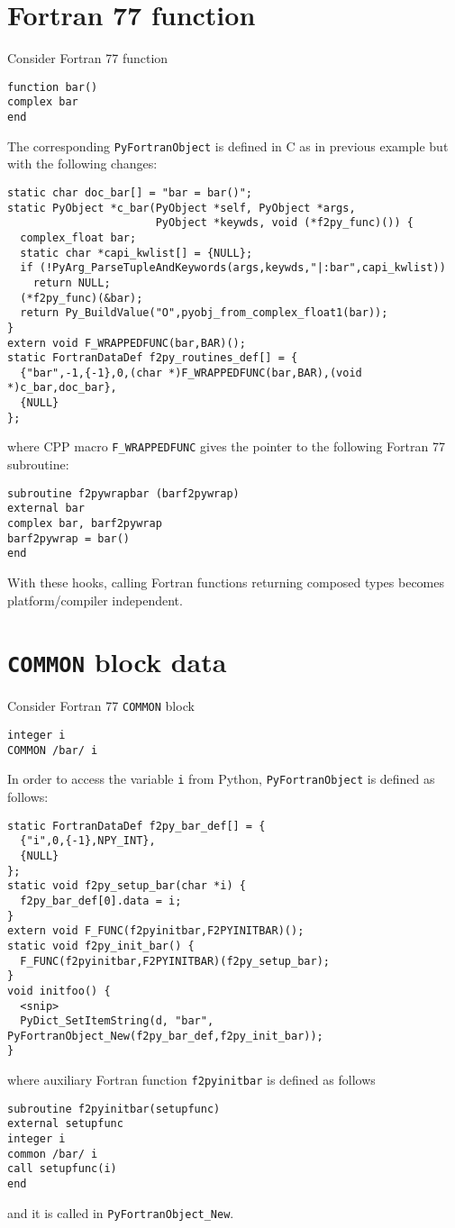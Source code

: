 \documentclass{article}
\begin{document}
\section{Fortran 77 function}
\label{sec:f77func}
Consider Fortran 77 function
\begin{verbatim}
function bar()
complex bar
end
\end{verbatim}
The corresponding \texttt{PyFortranObject} is defined in C as in
previous example but with the following changes:
\begin{verbatim}
static char doc_bar[] = "bar = bar()";
static PyObject *c_bar(PyObject *self, PyObject *args,
                       PyObject *keywds, void (*f2py_func)()) {
  complex_float bar;
  static char *capi_kwlist[] = {NULL};
  if (!PyArg_ParseTupleAndKeywords(args,keywds,"|:bar",capi_kwlist))
    return NULL;
  (*f2py_func)(&bar);
  return Py_BuildValue("O",pyobj_from_complex_float1(bar));
}
extern void F_WRAPPEDFUNC(bar,BAR)();
static FortranDataDef f2py_routines_def[] = {
  {"bar",-1,{-1},0,(char *)F_WRAPPEDFUNC(bar,BAR),(void *)c_bar,doc_bar},
  {NULL}
};
\end{verbatim}
where CPP macro \texttt{F\_WRAPPEDFUNC} gives the pointer to the following
Fortran 77 subroutine:
\begin{verbatim}
subroutine f2pywrapbar (barf2pywrap)
external bar
complex bar, barf2pywrap
barf2pywrap = bar()
end
\end{verbatim}
With these hooks, calling Fortran functions returning composed types
becomes platform/compiler independent.


\section{\texttt{COMMON} block data}
\label{sec:commondata}

Consider Fortran 77 \texttt{COMMON} block
\begin{verbatim}
integer i
COMMON /bar/ i
\end{verbatim}
In order to access the variable \texttt{i} from Python,
\texttt{PyFortranObject} is defined as follows:
\begin{verbatim}
static FortranDataDef f2py_bar_def[] = {
  {"i",0,{-1},NPY_INT},
  {NULL}
};
static void f2py_setup_bar(char *i) {
  f2py_bar_def[0].data = i;
}
extern void F_FUNC(f2pyinitbar,F2PYINITBAR)();
static void f2py_init_bar() {
  F_FUNC(f2pyinitbar,F2PYINITBAR)(f2py_setup_bar);
}
void initfoo() {
  <snip>
  PyDict_SetItemString(d, "bar", PyFortranObject_New(f2py_bar_def,f2py_init_bar));
}
\end{verbatim}
where auxiliary Fortran function \texttt{f2pyinitbar} is defined as follows
\begin{verbatim}
subroutine f2pyinitbar(setupfunc)
external setupfunc
integer i
common /bar/ i
call setupfunc(i)
end
\end{verbatim}
and it is called in \texttt{PyFortranObject\_New}.
\end{document}
